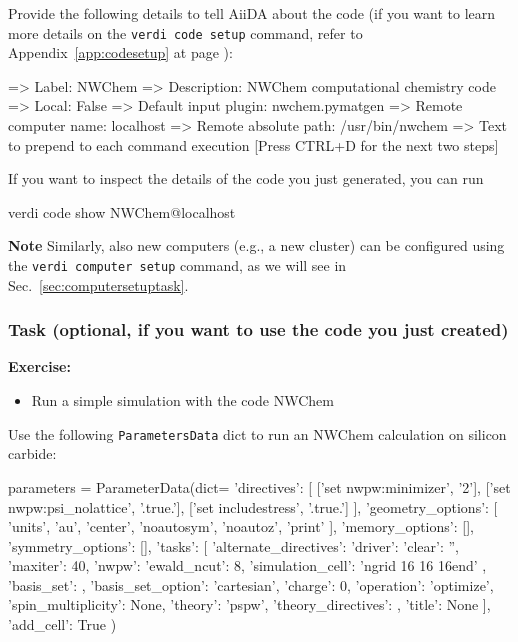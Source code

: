 Provide the following details to tell AiiDA about the code (if you want to learn more details on the \texttt{verdi code setup} command, refer to Appendix~\ref{app:codesetup} at page \pageref{app:codesetup}):

\begin{bashcommand}
=> Label: NWChem
=> Description: NWChem computational chemistry code
=> Local: False
=> Default input plugin: nwchem.pymatgen
=> Remote computer name: localhost
=> Remote absolute path: /usr/bin/nwchem
=> Text to prepend to each command execution
[Press CTRL+D for the next two steps]
\end{bashcommand}

If you want to inspect the details of the code you just generated, you can run
\begin{bashcommand}
verdi code show NWChem@localhost
\end{bashcommand}

\textbf{Note} Similarly, also new computers (e.g., a new cluster) can be configured using the \texttt{verdi computer setup} command, as we will see in Sec.~\ref{sec:computersetuptask}.

\subsubsection*{Task (optional, if you want to use the code you just created)}

\begin{tcolorbox}
\textbf{Exercise:}
\begin{itemize}
\item Run a simple simulation with the code NWChem
\end{itemize}
\end{tcolorbox}


Use the following \texttt{ParametersData} dict to run an NWChem calculation on silicon carbide:

\begin{pythoncommand}
parameters = ParameterData(dict={
    'directives': [
        ['set nwpw:minimizer', '2'],
        ['set nwpw:psi_nolattice', '.true.'],
        ['set includestress', '.true.']
    ],
    'geometry_options': [
        'units',
        'au',
        'center',
        'noautosym',
        'noautoz',
        'print'
    ],
    'memory_options': [],
    'symmetry_options': [],
    'tasks': [
        {
            'alternate_directives': {
                'driver': {'clear': '', 'maxiter': 40},
                'nwpw': {'ewald_ncut': 8, 
                         'simulation_cell': '\n  ngrid 16 16 16\n end'}
            },
            'basis_set': {},
            'basis_set_option': 'cartesian',            
            'charge': 0,
            'operation': 'optimize',
            'spin_multiplicity': None,
            'theory': 'pspw',
            'theory_directives': {},
            'title': None
        }
    ],
    'add_cell': True
})
\end{pythoncommand}

